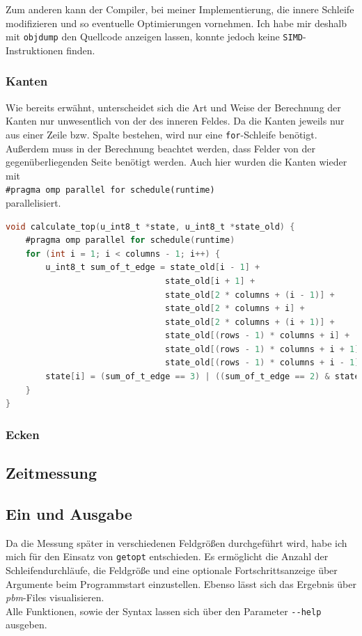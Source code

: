 \documentclass[german,plainarticle,hyperref,utf8]{zihpub}
\begin{document}
	Zum anderen kann der Compiler, bei meiner Implementierung, die innere Schleife modifizieren und so eventuelle Optimierungen vornehmen. Ich habe mir deshalb mit \texttt{objdump} den Quellcode anzeigen lassen, konnte jedoch keine \texttt{SIMD}-Instruktionen finden.
	
	\subsubsection{Kanten}
	
	Wie bereits erwähnt, unterscheidet sich die Art und Weise der Berechnung der Kanten nur unwesentlich von der des inneren Feldes. Da die Kanten jeweils nur aus einer Zeile bzw. Spalte bestehen, wird nur eine \texttt{for}-Schleife benötigt. Außerdem muss in der Berechnung beachtet werden, dass Felder von der gegenüberliegenden Seite benötigt werden.
	Auch hier wurden die Kanten wieder mit\\
	
	\texttt{\#pragma omp parallel for schedule(runtime)}\\
	
	parallelisiert.	
	\begin{lstlisting}[language=C, caption=Beispielhafte Berechnung der obersten Zeile]
void calculate_top(u_int8_t *state, u_int8_t *state_old) {
	#pragma omp parallel for schedule(runtime)
	for (int i = 1; i < columns - 1; i++) {
		u_int8_t sum_of_t_edge = state_old[i - 1] +
								state_old[i + 1] +
								state_old[2 * columns + (i - 1)] +
								state_old[2 * columns + i] +
								state_old[2 * columns + (i + 1)] +
								state_old[(rows - 1) * columns + i] +
								state_old[(rows - 1) * columns + i + 1] +
								state_old[(rows - 1) * columns + i - 1];
		state[i] = (sum_of_t_edge == 3) | ((sum_of_t_edge == 2) & state_old[i]);
	}
}\end{lstlisting}

	\subsubsection{Ecken}
	
	\subsection{Zeitmessung}	
	
	\subsection{Ein und Ausgabe}
	Da die Messung später in verschiedenen Feldgrößen durchgeführt wird, habe ich mich für den Einsatz von \verb|getopt| entschieden. Es ermöglicht die Anzahl der Schleifendurchläufe, die Feldgröße und eine optionale Fortschrittsanzeige über Argumente beim Programmstart einzustellen.
	Ebenso lässt sich das Ergebnis über \textit{pbm}-Files visualisieren.\\
	Alle Funktionen, sowie der Syntax lassen sich über den Parameter \texttt{-{}-help} ausgeben.
	
\end{document}
